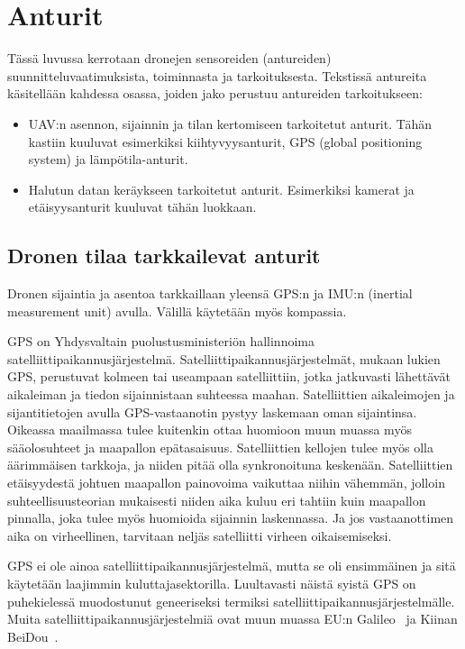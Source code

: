 \chapter{Anturit}
\label{ch:anturit}

Tässä luvussa kerrotaan dronejen sensoreiden (antureiden)
suunnitteluvaatimuksista, toiminnasta ja tarkoituksesta.  Tekstissä antureita
käsitellään kahdessa osassa, joiden jako perustuu antureiden tarkoitukseen:
\begin{itemize}
\item UAV:n asennon, sijainnin ja tilan kertomiseen tarkoitetut anturit. Tähän
  kastiin kuuluvat esimerkiksi kiihtyvyysanturit, GPS (global positioning
  system) ja lämpötila-anturit.
\item Halutun datan keräykseen tarkoitetut anturit. Esimerkiksi kamerat ja
  etäisyysanturit kuuluvat tähän luokkaan.
\end{itemize}

\section{Dronen tilaa tarkkailevat anturit}
Dronen sijaintia ja asentoa tarkkaillaan yleensä GPS:n ja IMU:n (inertial
measurement unit) avulla. Välillä käytetään myös kompassia.

GPS on Yhdysvaltain puolustusministeriön hallinnoima
satelliittipaikannusjärjestelmä. Satelliittipaikannusjärjestelmät, mukaan
lukien GPS, perustuvat kolmeen tai useampaan satelliittiin, jotka jatkuvasti
lähettävät aikaleiman ja tiedon sijainnistaan suhteessa maahan. Satelliittien
aikaleimojen ja sijantitietojen avulla GPS-vastaanotin pystyy laskemaan oman
sijaintinsa. Oikeassa maailmassa tulee kuitenkin ottaa huomioon muun muassa
myös sääolosuhteet ja maapallon epätasaisuus. Satelliittien kellojen tulee myös
olla äärimmäisen tarkkoja, ja niiden pitää olla synkronoituna keskenään.
Satelliittien etäisyydestä johtuen maapallon painovoima vaikuttaa niihin
vähemmän, jolloin suhteellisuusteorian mukaisesti niiden aika kuluu eri tahtiin
kuin maapallon pinnalla, joka tulee myös huomioida sijainnin
laskennassa. Ja jos vastaanottimen aika on virheellinen, tarvitaan neljäs
satelliitti virheen oikaisemiseksi.~\cite{Parkinson1995}

GPS ei ole ainoa satelliittipaikannusjärjestelmä, mutta se oli ensimmäinen ja
sitä käytetään laajimmin kuluttajasektorilla. Luultavasti näistä syistä GPS on
puhekielessä muodostunut geneeriseksi termiksi
satelliittipaikannusjärjestelmälle. Muita satelliittipaikannusjärjestelmiä ovat
muun muassa EU:n Galileo~\cite{EUGalileo} ja Kiinan BeiDou~\cite{CNBeiDou}.

